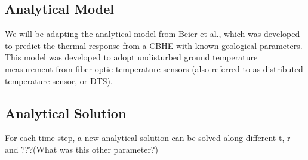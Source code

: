 \subsection{Analytical Model}
	We will be adapting the analytical model from Beier et al., which was developed to predict the thermal response from a CBHE with known geological parameters. This model was developed to adopt undisturbed ground temperature measurement from fiber optic temperature sensors (also referred to as distributed temperature sensor, or DTS). 
	
	
	
		
\subsection{Analytical Solution}
	For each time step, a new analytical solution can be solved along different t, r and ???(What was this other parameter?)
	

	
